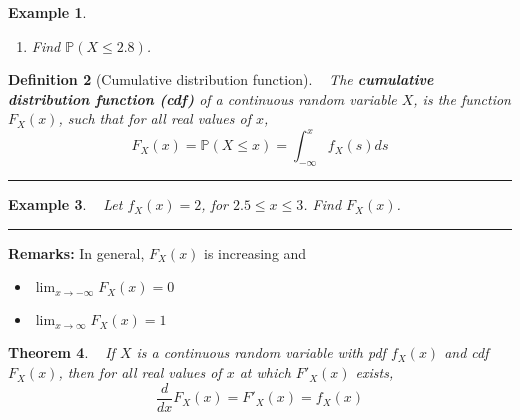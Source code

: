 \documentclass[12pt]{amsart}
\newtheorem{theorem}{Theorem}[section]
\newtheorem{definition}[theorem]{Definition}
\newtheorem{example}[theorem]{Example}
\newcommand\Pbb{\mathbb{P}}
\newcommand\pdfX{f_X(x)}
\newcommand\cdfX{F_X(x)}
\begin{document}
{\begin{example}
\begin{enumerate}
\item Find $\Pbb(X \leq 2.8)$.

\end{enumerate}

\end{example}


\newpage


\begin{definition}[Cumulative distribution function]\ \newline
The \textbf{cumulative distribution function (cdf)} of a continuous random variable $X$, is the function $F_X(x)$, such that for all real values of $x$,
$$
\cdfX = \mathbb{P}(X \leq x) = \int_{-\infty}^x f_X(s)ds
$$
\end{definition}

\vspace{.5cm}
\hrule
\vspace{.5cm}
\begin{example}\ %
Let $\pdfX = 2$, for $2.5 \leq x \leq 3$. Find $\cdfX$.

\end{example}

\vspace{7cm}
\hrule
\vspace{.5cm}

\textbf{Remarks:} \newline
In general, $F_X(x)$ is increasing and
\begin{itemize}
\item  $\lim_{x\rightarrow -\infty} \cdfX = 0$
\item  $\lim_{x\rightarrow \infty} \cdfX = 1$
\end{itemize}

\vspace{7cm}
\begin{theorem}\ \newline
If $X$ is a continuous random variable with pdf $\pdfX$ and cdf $F_X(x)$, then for all real values of $x$ at which $F'_X(x)$ exists,
$$
\frac{d}{dx} \cdfX = F'_X(x) = f_X(x)
$$
\end{theorem}


}
\end{document}
